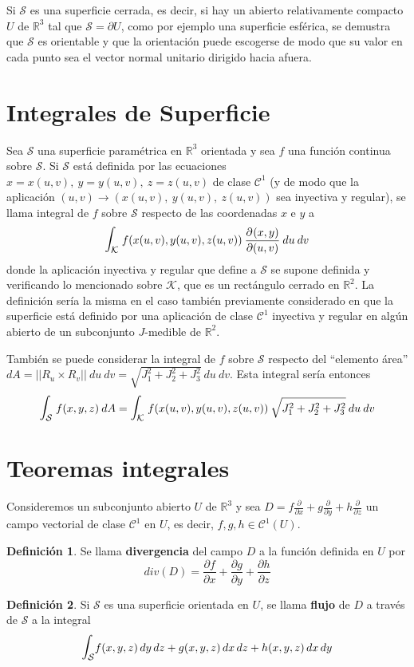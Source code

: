 \documentclass[12pt,twoside]{report}
\newcommand\mc[1]{\mathcal{#1}}
\newcommand{\bbint}{\mathlarger{\mathlarger{\int}}}
\newcommand*{\pd}[3][]{\ensuremath{\dfrac{\partial^{#1} #2}{\partial #3}}}
\theoremstyle{azul}
\theoremstyle{azul2}
\theoremstyle{plain}
\theoremstyle{definition}
\newtheorem{defin}{Definición}[chapter]
\theoremstyle{remark}
\begin{document}
Si $\mc{S}$ es una superficie cerrada, es decir, si hay un abierto relativamente compacto $U$ de $\mathbb{R}^3$ tal que $\mc{S}=\partial U$, como por ejemplo una superficie esférica, se demustra que $\mc{S}$ es orientable y que la orientación puede escogerse de modo que su valor en cada punto sea el vector normal unitario dirigido hacia afuera.

\section{Integrales de Superficie}

Sea $\mc{S}$ una superficie paramétrica en $\mathbb{R}^3$ orientada y sea $f$ una función continua sobre $\mc{S}$. Si $\mc{S}$ está definida por las ecuaciones $x=x(u,v), \: y=y(u,v), \: z=z(u,v)$ de clase $\mc{C}^1$ (y de modo que la aplicación $(u,v) \longrightarrow (x(u,v), \: y(u,v), \: z(u,v))$ sea inyectiva y regular), se llama integral de $f$ sobre $\mc{S}$ respecto de las coordenadas $x$ e $y$ a 
$$\bbint_{\mc{K}} \; f(x(u,v), y(u,v), z(u,v)) \: \pd{(x,y)}{(u,v)} \: du \: dv$$
donde la aplicación inyectiva y regular que define a $\mc{S}$ se supone definida y verificando lo mencionado sobre $\mc{K}$, que es un rectángulo cerrado en $\mathbb{R}^2$. La definición sería la misma en el caso también previamente considerado en que la superficie está definido por una aplicación de clase $\mc{C}^1$ inyectiva y regular en algún abierto de un subconjunto $J$-medible de $\mathbb{R}^2$.

También se puede considerar la integral de $f$ sobre $\mc{S}$ respecto del ``elemento área'' $dA=||R_u \times R_v|| \: du \: dv = \sqrt{J_1^2+J_2^2+J_3^2} \: du \: dv$. Esta integral sería entonces
$$\bbint_{\mc{S}} \; f(x,y,z) \: dA = \bbint_{\mc{K}} \; f(x(u,v),y(u,v),z(u,v)) \: \sqrt{J_1^2+J_2^2+J_3^2} \: du \: dv$$

\section{Teoremas integrales}
Consideremos un subconjunto abierto $U$ de $\mathbb{R}^3$ y sea $D = f \frac{\partial}{\partial x} + g \frac{\partial}{\partial y} + h \frac{\partial}{\partial z}$ un campo vectorial de clase $\mc{C}^1$ en $U$, es decir, $f, g, h \in \mc{C}^1(U)$.

\begin{defin}
Se llama \textbf{divergencia} del campo $D$ a la función definida en $U$ por $$div(D) = \frac{\partial f}{\partial x} + \frac{\partial g}{\partial y} + \frac{\partial h}{\partial z}$$
\end{defin}
\begin{defin}
Si $\mc{S}$ es una superficie orientada en $U$, se llama \textbf{flujo} de $D$ a través de $\mc{S}$ a la integral $$\bbint_{\mc{S}} f(x,y,z)\,dy\,dz + g(x,y,z)\,dx\,dz + h(x,y,z)\, dx \, dy$$
\end{defin}
\end{document}
